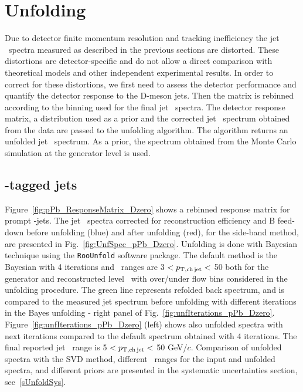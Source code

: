
\section{Unfolding}
\label{sect:unfResults}

Due to detector finite momentum resolution and tracking inefficiency the jet \pt\ spectra measured as described
in the previous sections are distorted. These distortions are detector-specific and do not allow a direct comparison
with theoretical models and other independent experimental results.
In order to correct for these distortions, we first need to assess the detector performance and quantify
the detector response to the D-meson jets. 
Then the matrix is rebinned according to the binning used for the final jet \pt\ spectra. The detector response matrix, a distribution used as a prior and the corrected jet \pt\ spectrum obtained from the data are passed to the unfolding algorithm. The algorithm returns an unfolded jet \pt\ spectrum. As a prior, the spectrum obtained from the Monte Carlo simulation at the generator level is used.


\subsection{\Dzero-tagged jets}

Figure~\ref{fig:pPb_ResponseMatrix_Dzero} shows a rebinned response matrix for prompt \Dzero-jets.
The jet \pt\ spectra corrected for reconstruction efficiency and B feed-down before unfolding (blue) and after unfolding (red), for the side-band method, are presented in Fig.~\ref{fig:UnfSpec_pPb_Dzero}.
Unfolding is done with Bayesian technique using the \texttt{RooUnfold} software package. The default method is the Bayesian with 4 iterations and \ptchjet\ ranges are 3 $< p_{\mathrm{T,ch\, jet}}< $ 50 both for the generator and reconstructed level \pt\, with over/under flow bins considered in the unfolding procedure.
The green line represents refolded back spectrum, and is compared to the measured jet spectrum before unfolding with different iterations in the Bayes unfolding - right panel of Fig.~\ref{fig:unfIterations_pPb_Dzero}. Figure~\ref{fig:unfIterations_pPb_Dzero} (left) shows also unfolded spectra with next iterations compared to the default spectrum obtained with 4 iterations.
The final reported jet \pt\ range is 5 $< p_{\mathrm{T,ch\, jet}}<$ 50 GeV/$c$.
Comparison of unfolded spectra with the SVD method, different \pt\ ranges for the input and unfolded spectra, and different priors are presented in the systematic uncertainties section, see~\ref{sUnfoldSys}. 

